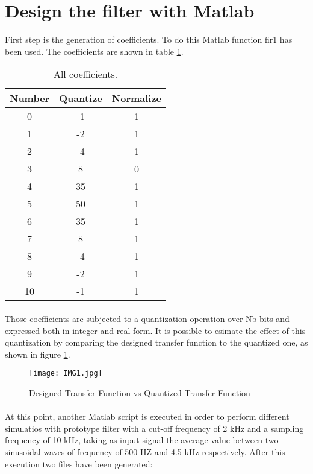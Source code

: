 \section{Design the filter with Matlab}

First step is the generation of coefficients. To do this Matlab function fir1 has been used.
The coefficients are shown in table \ref{tab:1}. %

\begin{table}[ht]
\centering
\begin{tabular}{c|c|c}
\toprule
Number & Quantize & Normalize \\
\midrule
0 & -1 & 1 \\
1 & -2 & 1 \\
2 & -4 & 1 \\
3 & 8 & 0 \\
4 & 35 & 1 \\
5 & 50 & 1 \\
6 & 35 & 1 \\
7 & 8 & 1 \\
8 & -4 & 1 \\
9 & -2 & 1 \\
10 & -1 & 1 \\
\bottomrule
\end{tabular}
\caption{All coefficients.}
\label{tab:1}
\end{table}

\paragraph{}
Those coefficients are subjected to a quantization operation over Nb bits and expressed both in integer and real form.
It is possible to esimate the effect of this quantization by comparing the designed transfer function to the quantized one, as shown in figure \ref{fig:1}.
\begin{figure}[!ht]
	\caption{Designed Transfer Function vs Quantized Transfer Function}
	\label{fig:1}
	\texttt{[image: IMG1.jpg]}
	\centering
\end{figure}

\paragraph{}

At this point, another Matlab script is executed in order to perform
different simulatios with prototype filter with a cut-off frequency of 2 kHz and a sampling frequency of 10 kHz, taking as 
input signal the average value between two sinusoidal waves of frequency of 500 HZ and 4.5 kHz respectively.
After this execution two files have been generated:

